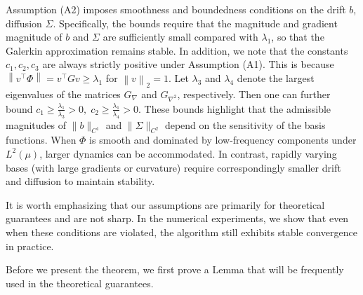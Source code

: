 \documentclass[12pt]{article}
\def\lam{\lambda}
\def\ll{\left\lVert}
\def\rl{\right\rVert}
\begin{document}
Assumption (A2) imposes smoothness and boundedness conditions on the drift $b$, diffusion $\Sigma$. Specifically, the bounds require that the magnitude and gradient magnitude of $b$ and $\Sigma$ are sufficiently small compared with $\lam_1$, so that the Galerkin approximation remains stable. In addition, we note that the constants $c_1, c_2, c_3$ are always strictly positive under Assumption (A1). This is because $\ll v^\top \Phi \rl = v^\top G v \geq \lam_1$ for $\ll v \rl_2 = 1$. Let $\lambda_3$ and $\lambda_4$ denote the largest eigenvalues of the matrices $G_{\nabla}$ and $G_{\nabla^2}$, respectively. Then one can further bound $c_1 \geq \frac{\lambda_1}{\lambda_3}>0, \; c_2 \geq \frac{\lambda_1}{\lambda_4}>0$. These bounds highlight that the admissible magnitudes of $\|b\|_{C^1}$ and $\|\Sigma\|_{C^2}$ depend on the sensitivity of the basis functions. When $\Phi$ is smooth and dominated by low-frequency components under $L^2(\mu)$, larger dynamics can be accommodated. In contrast, rapidly varying bases (with large gradients or curvature) require correspondingly smaller drift and diffusion to maintain stability.

It is worth emphasizing that our assumptions are primarily for theoretical guarantees and are not sharp. 
In the numerical experiments, we show that even when these conditions are violated, the algorithm still exhibits stable convergence in practice. 

\fi


Before we present the theorem, we first prove a Lemma that will be frequently used in the theoretical guarantees. 
\end{document}
